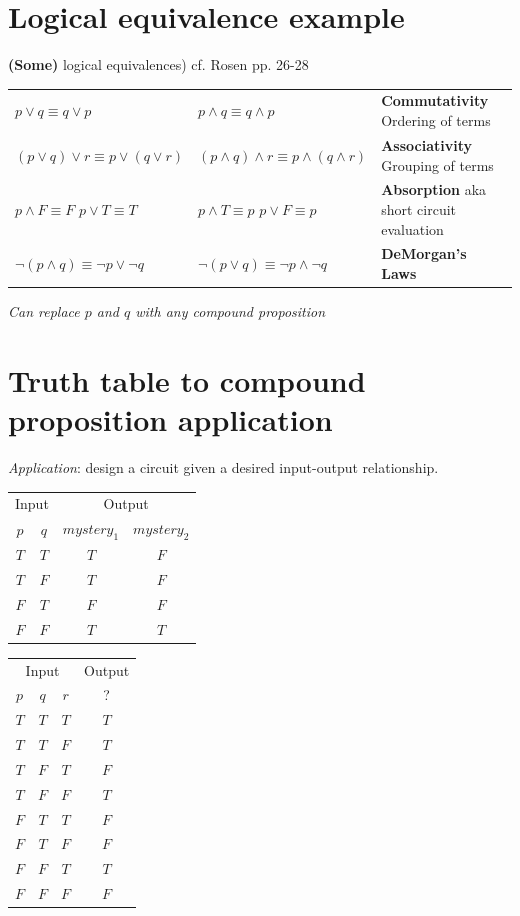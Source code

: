 \documentclass[12pt, oneside]{article}
\begin{document}
\section*{Logical equivalence example}


{\bf (Some)} logical equivalences) cf. Rosen pp. 26-28

\begin{tabular}{llp{3in}}
$p \lor q \equiv q \lor p$ & $p \land q \equiv q \land p$ & {\bf Commutativity} Ordering of terms\\
$(p \lor q) \lor r  \equiv p \lor (q \lor r)$ & $(p \land q) \land r  \equiv p \land (q \land r)$ & {\bf Associativity} Grouping of terms\\
$p \land F \equiv F$ \qquad $p \lor T \equiv T$ & $p \land T \equiv p$ \qquad $p \lor F \equiv p$ & {\bf Absorption} aka 
short circuit evaluation\\
$\lnot (p \land q) \equiv \lnot p \lor \lnot q$ & $\lnot (p \lor q) \equiv \lnot p \land\lnot q$  & {\bf DeMorgan's Laws}\end{tabular}


{\it Can replace $p$ and $q$ with any compound proposition}

\vfill \vfill
\section*{Truth table to compound proposition application}


{\it Application}: design a circuit given a desired input-output relationship.

\begin{center}
\begin{tabular}{cc||cc}
\multicolumn{2}{c||}{Input}  &\multicolumn{2}{c}{Output}\\
$p$ & $q$& $mystery_1$ & $mystery_2$\\
\hline
$T$ & $T$  & $T$ & $F$\\
$T$ & $F$  & $T$ & $F$\\
$F$ & $T$  & $F$ & $F$\\
$F$ & $F$  & $T$ & $T$\\
\end{tabular}
\qquad \qquad
\begin{tabular}{ccc||c}
\multicolumn{3}{c||}{Input}  & Output\\
$p$ & $q$ & $r$  &  ?\\
\hline
$T$ & $T$  & $T$ & $T$ \\
$T$ & $T$  & $F$ & $T$ \\
$T$ & $F$  & $T$ & $F$ \\
$T$ & $F$  & $F$ & $T$ \\
$F$ & $T$  & $T$ & $F$ \\
$F$ & $T$  & $F$ & $F$ \\
$F$ & $F$  & $T$ & $T$ \\
$F$ & $F$  & $F$ & $F$ \\
\end{tabular}

\end{center}
\end{document}
